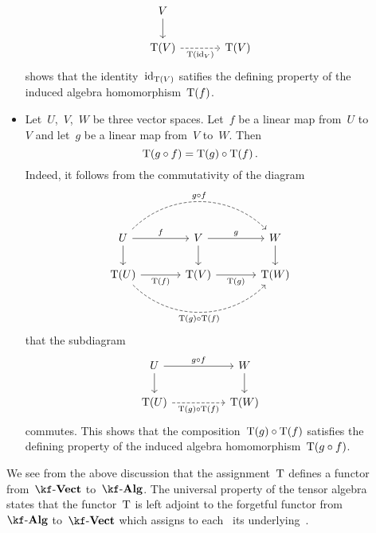 \begin{recall}
\begin{description}
\begin{itemize}
\[\begin{tikzcd}[column sep = large]
              V
              \arrow{d}
              \\
              \Tensor(V)
              \arrow[dashed]{r}[below]{\Tensor(\id_V)}
              &
              \Tensor(V)
            \end{tikzcd}
          \]
          shows that the identity~$\mathrm{id}_{\operatorname{T}(V)}$ satifies the defining property of the induced algebra homomorphism~$\operatorname{T}(f)$.
        \item
          Let~$U$,~$V$,~$W$ be three vector spaces.
          Let~$f$ be a linear map from~$U$ to~$V$ and let~$g$ be a linear map from~$V$ to~$W$.
          Then
          \[
            \operatorname{T}(g \circ f)
            =
            \operatorname{T}(g) \circ \operatorname{T}(f) \,.
          \]
          Indeed, it follows from the commutativity of the diagram
          \[
            \begin{tikzcd}[column sep = large]
              U
              \arrow[dashed, bend left=45]{rr}[above]{g \circ f}
              \arrow{r}[above]{f}
              \arrow{d}
              &
              V
              \arrow{r}[above]{g}
              \arrow{d}
              &
              W
              \arrow{d}
              \\
              \Tensor(U)
              \arrow{r}[below]{\Tensor(f)}
              \arrow[dashed, bend right=45]{rr}[below]{\Tensor(g) \circ \Tensor(f)}
              &
              \Tensor(V)
              \arrow{r}[below]{\Tensor(g)}
              &
              \Tensor(W)
            \end{tikzcd}
          \]
          that the subdiagram
          \[
            \begin{tikzcd}[column sep = huge]
              U
              \arrow{r}[above]{g \circ f}
              \arrow{d}
              &
              W
              \arrow{d}
              \\
              \Tensor(U)
              \arrow[dashed]{r}[below]{\Tensor(g) \circ \Tensor(f)}
              &
              \Tensor(W)
            \end{tikzcd}
          \]
          commutes.
          This shows that the composition~$\operatorname{T}(g) \circ \operatorname{T}(f)$ satisfies the defining property of the induced algebra homomorphism~$\operatorname{T}(g \circ f)$.
      \end{itemize}
      
      We see from the above discussion that the assignment~$\operatorname{T}$ defines a functor from~$\cVect{\kf}$ to~$\cAlg{\kf}$.
      The universal property of the tensor algebra states that the functor~$\operatorname{T}$ is left adjoint to the forgetful functor from~$\cAlg{\kf}$ to~$\cVect{\kf}$ which assigns to each~{\algebra{$\kf$}} its underlying~{\vectorspace{$\kf$}}.
    

\end{description}
\end{recall}

